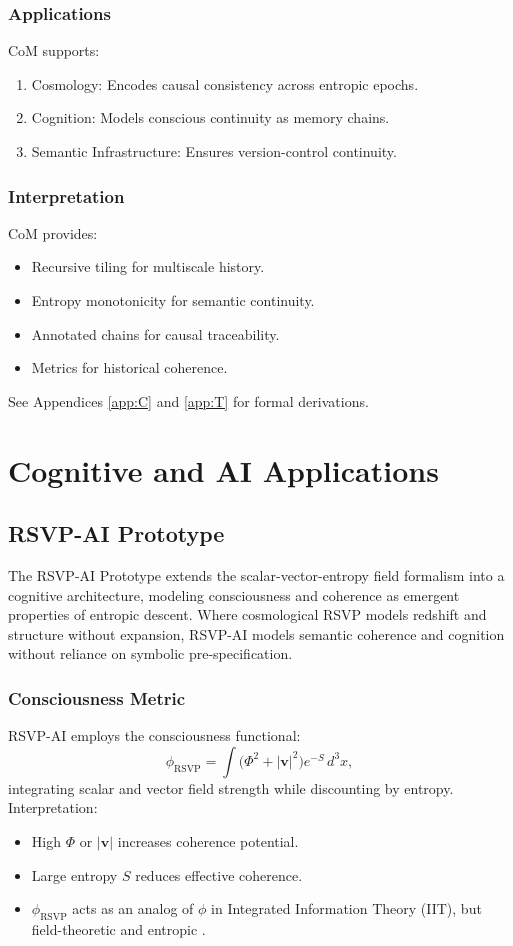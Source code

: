 \documentclass[12pt]{report}
\begin{document}
\section{Applications}
CoM supports:
\begin{enumerate}
    \item Cosmology: Encodes causal consistency across entropic epochs.
    \item Cognition: Models conscious continuity as memory chains.
    \item Semantic Infrastructure: Ensures version-control continuity.
\end{enumerate}

\section{Interpretation}
CoM provides:
\begin{itemize}
    \item Recursive tiling for multiscale history.
    \item Entropy monotonicity for semantic continuity.
    \item Annotated chains for causal traceability.
    \item Metrics for historical coherence.
\end{itemize}
See Appendices \ref{app:C} and \ref{app:T} for formal derivations.

\part{Cognitive and AI Applications}

\chapter{RSVP-AI Prototype}
\label{chap:rsvp-ai}
The RSVP-AI Prototype extends the scalar-vector-entropy field formalism into a cognitive architecture, modeling consciousness and coherence as emergent properties of entropic descent. Where cosmological RSVP models redshift and structure without expansion, RSVP-AI models semantic coherence and cognition without reliance on symbolic pre-specification.

\section{Consciousness Metric}
RSVP-AI employs the consciousness functional:
\begin{equation}
\phi_{\text{RSVP}} = \int \big(\Phi^2 + |\mathbf{v}|^2 \big) e^{-S} \, d^3x, \label{eq:phirsvp}
\end{equation}
integrating scalar and vector field strength while discounting by entropy. Interpretation:
\begin{itemize}
    \item High \(\Phi\) or \(|\mathbf{v}|\) increases coherence potential.
    \item Large entropy \(S\) reduces effective coherence.
    \item \(\phi_{\text{RSVP}}\) acts as an analog of \(\phi\) in Integrated Information Theory (IIT), but field-theoretic and entropic \citep{Tononi2016}.
\end{itemize}
\end{document}
